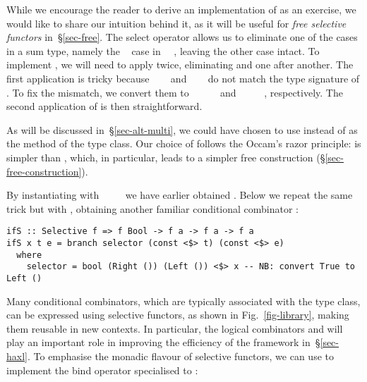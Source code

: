 {%

\noindent
While we encourage the reader to derive an implementation of  as an
exercise, we would like to share our intuition behind it, as it will be useful
for \emph{free selective functors} in~\S\ref{sec-free}. The select operator
allows us to eliminate one of the cases in a sum type, namely the
~ case in ~~, leaving the other case
intact. To implement , we will need to apply  twice,
eliminating  and  one after another. The first application is tricky
because ~~~ and
~\hs{(}~\hs{->}~ do not match the type signature of .
To fix the mismatch, we convert them to
~~~\hs{(}~~ and
~\hs{(}~\hs{->}~~~, respectively. The second
application of  is then straightforward.

As will be discussed in~\S\ref{sec-alt-multi}, we could have chosen to use
 instead of  as the method of the  type
class. Our choice of  follows the Occam's razor principle:
 is simpler than , which, in particular, leads to a
simpler free construction (\S\ref{sec-free-construction}).

By instantiating  with ~\hs{=}~~\hs{=}~\hs{()} we have
earlier obtained . Below we repeat the same trick but with
, obtaining another familiar conditional combinator :

\vspace{0.5mm}
\begin{verbatim}
ifS :: Selective f => f Bool -> f a -> f a -> f a
ifS x t e = branch selector (const <$> t) (const <$> e)
  where
    selector = bool (Right ()) (Left ()) <$> x -- NB: convert True to Left ()
\end{verbatim}
\vspace{0.5mm}

\noindent
Many conditional combinators, which are typically associated with the 
type class, can be expressed using selective functors, as shown in
Fig.~\ref{fig-library}, making them reusable in new contexts. In particular, the
logical combinators \hs{<||>} and \hs{<&&>} will play an important role in
improving the efficiency of the \Haxl framework in~\S\ref{sec-haxl}. To
emphasise the monadic flavour of selective functors, we can use  to
implement the bind operator specialised to :

}
